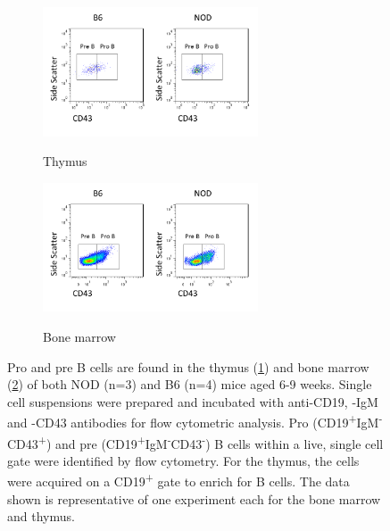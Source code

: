 


\begin{figure}	
	\begin{subfigure}{\textwidth}
	\centering
	\caption{Thymus}
	\includegraphics[width=0.7\textwidth]{Figures/Thymuspropre.png}
	\label{subfig:Thypropre}
	\end{subfigure}
	\begin{subfigure}{\textwidth}
	\centering
	\caption{Bone marrow}
	\includegraphics[width=0.7\textwidth]{Figures/Bonemarrowpropre.png}
	\label{subfig:BMpropre}
	\end{subfigure}
\caption[Pro and pre B cells are present in NOD and B6 mouse thymi]{Pro and pre B cells are found in the thymus (\ref{subfig:Thypropre}) and bone marrow (\ref{subfig:BMpropre}) of both NOD (n=3) and B6 (n=4) mice aged 6-9 weeks. Single cell suspensions were prepared and incubated with anti-CD19, -IgM and -CD43 antibodies for flow cytometric analysis. 
Pro (CD19\textsuperscript{+}IgM\textsuperscript{-}CD43\textsuperscript{+}) and pre (CD19\textsuperscript{+}IgM\textsuperscript{-}CD43\textsuperscript{-}) B cells within a live, single cell gate were identified by flow cytometry.
For the thymus, the cells were acquired on a CD19\textsuperscript{+} gate to enrich for B cells. 
The data shown is representative of one experiment each for the bone marrow and thymus.}
\label{fig:PropreBcells}
\end{figure}





